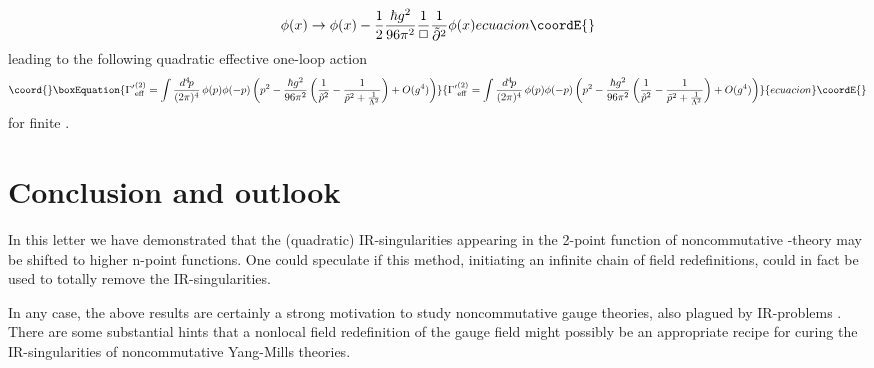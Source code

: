 \documentclass[a4paper,12pt]{article}
\begin{document}
\begin{itemize}
\begin{equation}
{    \phi(x) \rightarrow  \phi(x) - \frac{1}{2} \frac{\hbar g^2}{96 \pi^2} 
      \frac{1}{\Box} \frac{1}{\tilde{\partial}^2} \phi(x)
  }{ecuacion}\coordE{}\end{equation}
leading to the following quadratic effective one-loop action
  \begin{equation}\coord{}\boxEquation{
    {\Gamma'}^{{(2)}}_{\mathrm{eff}} = \int \frac{d^4 \! p}{(2 \pi)^4} \, 
      \phi(p) \phi(-p) \left(p^2 -  \frac{\hbar g^2}{96 \pi^2} \left( 
        \frac{1}{\tilde{p}^2} - \frac{1}{\tilde{p}^2 + \frac{1}{\Lambda^2}} 
          \right) + O(g^4) \right)  
  }{
    {\Gamma'}^{{(2)}}_{\mathrm{eff}} = \int \frac{d^4 \! p}{(2 \pi)^4} \, 
      \phi(p) \phi(-p) \left(p^2 -  \frac{\hbar g^2}{96 \pi^2} \left( 
        \frac{1}{\tilde{p}^2} - \frac{1}{\tilde{p}^2 + \frac{1}{\Lambda^2}} 
          \right) + O(g^4) \right)  
  }{ecuacion}\coordE{}\end{equation}
for finite \coordHE{}.
\end{itemize}


\section{Conclusion and outlook}
In this letter we have demonstrated that the (quadratic) IR-singularities appearing in the 2-point function of noncommutative \coordHE{}-theory may be shifted to higher  n-point functions. One could speculate if this method, initiating an infinite chain of field redefinitions, could in fact be used to totally remove the IR-singularities.

In any case, the above results are certainly a strong motivation to study noncommutative gauge theories, also plagued by IR-problems \cite{prep}. There are some substantial hints that a nonlocal field redefinition of the gauge field might possibly be an appropriate recipe for curing the IR-singularities of noncommutative Yang-Mills theories.
\end{document}
